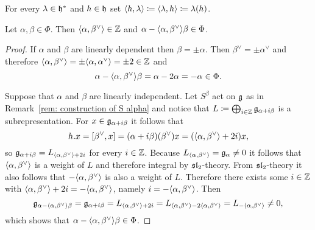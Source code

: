 \begin{definition}
 For every $\lambda \in \mathfrak{h}^*$ and $h \in \mathfrak{h}$ set $\langle h, \lambda\rangle \coloneqq \langle\lambda, h\rangle \coloneqq \lambda(h)$.
\end{definition}


\begin{proposition}\label{prop: integral and reflection properties of root pairing}
 Let $\alpha, \beta \in \Phi$. Then $\langle\alpha, \beta^\vee\rangle \in \mathbb{Z}$ and $\alpha - \langle\alpha, \beta^\vee\rangle \beta \in \Phi$.
\end{proposition}
\begin{proof}
 If $\alpha$ and $\beta$ are linearly dependent then $\beta = \pm \alpha$. Then $\beta^\vee = \pm \alpha^\vee$ and therefore $\langle\alpha, \beta^\vee\rangle = \pm \langle\alpha, \alpha^\vee\rangle = \pm 2 \in \mathbb{Z}$ and
 \[
 \alpha - \langle\alpha, \beta^\vee\rangle \beta
 = \alpha - 2 \alpha
 = -\alpha \in \Phi.
 \]
 
 Suppose that $\alpha$ and $\beta$ are linearly independent. Let $S^\beta$ act on $\mathfrak{g}$ as in Remark~\ref{rem: construction of S alpha} and notice that $L \coloneqq \bigoplus_{i \in \mathbb{Z}} \mathfrak{g}_{\alpha+i\beta}$ is a subrepresentation. For $x \in \mathfrak{g}_{\alpha+i\beta}$ it follows that
 \[
  h.x = [\beta^\vee, x] = (\alpha+i\beta)(\beta^\vee)x = (\langle\alpha, \beta^\vee\rangle+2i)x,
 \]
 so $\mathfrak{g}_{\alpha+i\beta} = L_{\langle\alpha, \beta^\vee\rangle+2i}$ for every $i \in \mathbb{Z}$. Because $L_{\langle\alpha, \beta^\vee\rangle} = \mathfrak{g}_\alpha \neq 0$ it follows that $\langle\alpha, \beta^\vee\rangle$ is a weight of $L$ and therefore integral by $\mathfrak{sl}_2$-theory. From $\mathfrak{sl}_2$-theory it also follows that $-\langle\alpha, \beta^\vee\rangle$ is also a weight of $L$. Therefore there exists some $i \in \mathbb{Z}$ with $\langle\alpha, \beta^\vee\rangle + 2i = -\langle\alpha, \beta^\vee\rangle$, namely $i = -\langle\alpha, \beta^\vee\rangle$. Then
 \[
  \mathfrak{g}_{\alpha - \langle\alpha, \beta^\vee\rangle \beta}
  = \mathfrak{g}_{\alpha + i\beta}
  = L_{\langle\alpha, \beta^\vee\rangle+2i}
  = L_{\langle\alpha, \beta^\vee\rangle -2\langle\alpha, \beta^\vee\rangle}
  = L_{-\langle\alpha, \beta^\vee\rangle}
  \neq 0,
 \]
 which shows that $\alpha - \langle\alpha, \beta^\vee\rangle \beta \in \Phi$.
\end{proof}


